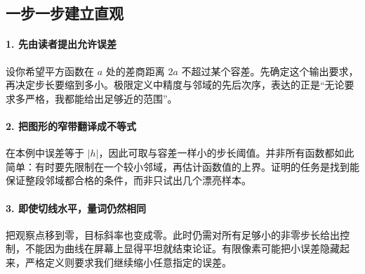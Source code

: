 \subsection*{一步一步建立直观}

\paragraph{1. 先由读者提出允许误差}

设你希望平方函数在 $a$ 处的差商距离 $2a$ 不超过某个容差。先确定这个输出要求，再决定步长要缩到多小。极限定义中精度与邻域的先后次序，表达的正是“无论要求多严格，我都能给出足够近的范围”。



\paragraph{2. 把图形的窄带翻译成不等式}

在本例中误差等于 $|h|$，因此可取与容差一样小的步长阈值。并非所有函数都如此简单：有时要先限制在一个较小邻域，再估计函数值的上界。证明的任务是找到能保证整段邻域都合格的条件，而非只试出几个漂亮样本。



\paragraph{3. 即使切线水平，量词仍然相同}

把观察点移到零，目标斜率也变成零。此时仍需对所有足够小的非零步长给出控制，不能因为曲线在屏幕上显得平坦就结束论证。有限像素可能把小误差隐藏起来，严格定义则要求我们继续缩小任意指定的误差。
